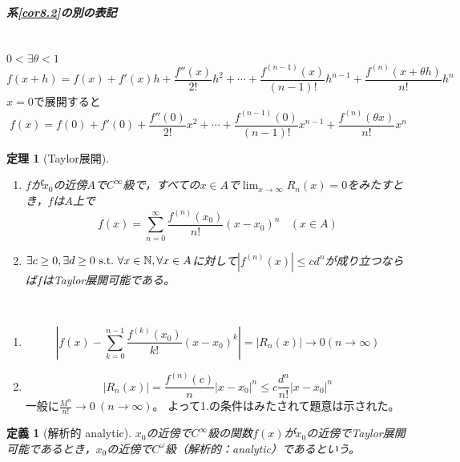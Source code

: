 \documentclass[dvipdfmx,a4j,10pt]{jsarticle}
\makeatletter
\theoremstyle{mystyle1}
\newtheorem{thm}[dfn]{定理}
\theoremstyle{mystyle2}
\newtheorem{dfn*}{定義}
\renewenvironment{proof}[1][\proofname]{\par
  \pushQED{\qed}%
  \normalfont
  \topsep6\p@\@plus6\p@ \trivlist
  \item[\hskip\labelsep{\bfseries\sffamily #1}]\ignorespaces
}{%
  \popQED\endtrivlist\@endpefalse
}
\renewcommand\proofname{証明}
\makeatother
\begin{document}
\newpage

\begin{framed}
    \subparagraph{系\ref{cor8.2}の別の表記}\
    \\
    $0<\exists \theta <1$
    \[
    f(x+h)=f(x)+f'(x)h+\frac{f''(x)}{2!}h^2+\cdots+\frac{f^{(n-1)}(x)}{(n-1)!}h^{n-1}+\frac{f^{(n)}(x+\theta h)}{n!}h^n
    \]
    $x=0$で展開すると
    \[
    f(x)=f(0)+f'(0)+\frac{f''(0)}{2!}x^2+\cdots+\frac{f^{(n-1)}(0)}{(n-1)!}x^{n-1}+\frac{f^{(n)}(\theta x)}{n!}x^n
    \]
\end{framed}

\begin{framed}
    \begin{thm}[Taylor展開]\label{thm8.3}\
        \vspace{-\baselineskip}
        \begin{enumerate}
            \item
            $f$が$x_0$の近傍$A$\footnotemark で$C^\infty$級で，すべての$x\in A$で$\displaystyle \lim_{x\to\infty}R_n(x)=0$をみたすとき，$f$は$A$上で
            \[
            f(x)=\sum_{n=0}^\infty \frac{f^{(n)}(x_0)}{n!}(x-x_0)^n\ \ \ \ (x\in A)
            \]
            \item
            $\exists c\geq 0,\exists d\geq 0 \ {\rm s.t.\ }\forall x\in\mathbb{N},\forall x\in A$に対して$|f^{(n)}(x)|\leq cd^n$が成り立つならば$f$はTaylor展開可能である。
        \end{enumerate}
    \end{thm}
\end{framed}

\begin{proof}[定理\ref{thm8.3}の証明]\
\begin{enumerate}
\item
\[
\left|f(x)-\sum_{k=0}^{n-1}\frac{f^{(k)}(x_0)}{k!}(x-x_0)^k\right|=|R_n(x)|\to 0 (n\to\infty)
\]

\item
\[
|R_n(x)|=\frac{f^{(n)}(c)}{n}|x-x_0|^n\leq c\frac{d^n}{n!}|x-x_0|^n
\]
一般に$\displaystyle \frac{M^n}{n!}\to0\ (n\to\infty)$。
よって1.の条件はみたされて題意は示された。
\end{enumerate}
\end{proof}

\begin{dfn*}[解析的 analytic]
    $x_0$の近傍で$C^\infty$級の関数$f(x)$が$x_0$の近傍でTaylor展開可能であるとき，$x_0$の近傍で$C^\omega$級（解析的：analytic）であるという。
\end{dfn*}
\end{document}
